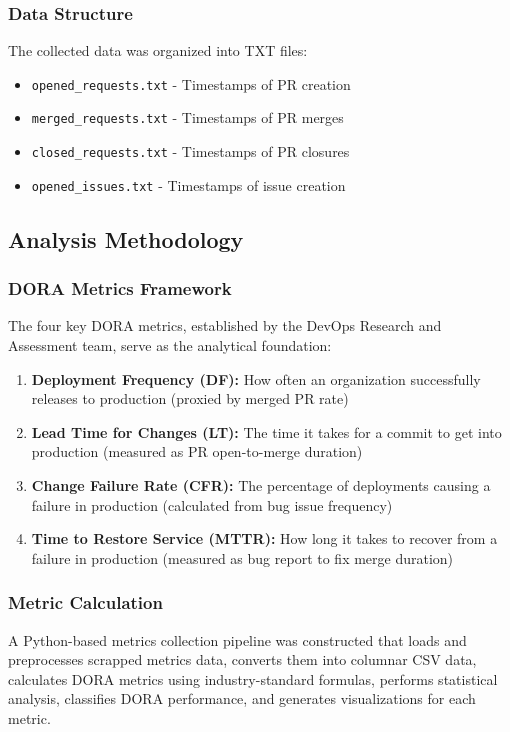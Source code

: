 \documentclass[12pt]{article}
\begin{document}
\subsubsection{Data Structure}
The collected data was organized into TXT files:
\begin{itemize}
  \item \texttt{opened\_requests.txt} - Timestamps of PR creation
  \item \texttt{merged\_requests.txt} - Timestamps of PR merges
  \item \texttt{closed\_requests.txt} - Timestamps of PR closures
  \item \texttt{opened\_issues.txt} - Timestamps of issue creation
\end{itemize}

\subsection{Analysis Methodology}

\subsubsection{DORA Metrics Framework}
The four key DORA metrics, established by the DevOps Research and
Assessment team, serve as the analytical foundation:

\begin{enumerate}
  \item \textbf{Deployment Frequency (DF):} How often an organization
    successfully releases to production (proxied by merged PR rate)
  \item \textbf{Lead Time for Changes (LT):} The time it takes for a
    commit to get into production (measured as PR open-to-merge duration)
  \item \textbf{Change Failure Rate (CFR):} The percentage of
    deployments causing a failure in production (calculated from bug
    issue frequency)
  \item \textbf{Time to Restore Service (MTTR):} How long it takes to
    recover from a failure in production (measured as bug report to
    fix merge duration)
\end{enumerate}

\subsubsection{Metric Calculation}
A Python-based metrics collection pipeline was constructed that loads
and preprocesses
scrapped metrics data, converts them into columnar CSV data,
calculates DORA metrics using
industry-standard formulas, performs statistical analysis, classifies
DORA performance,
and generates visualizations for each metric.
\end{document}
